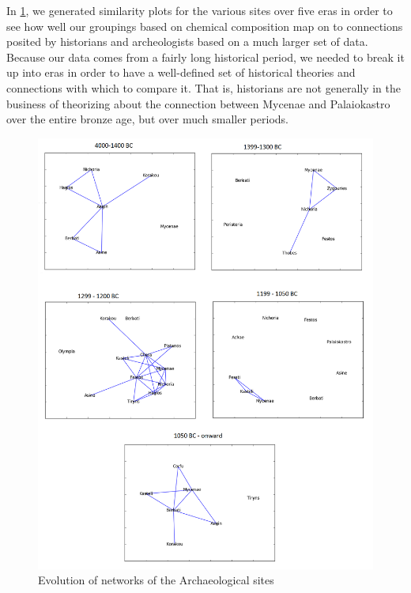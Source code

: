 



In \cref{fig:evolution}, we generated similarity plots for the various sites over five eras in order to see how well our groupings based on chemical composition map on to connections posited by historians and archeologists based on a much larger set of data. Because our data comes from a fairly long historical period, we needed to break it up into eras in order to have a well-defined set of historical theories and connections with which to compare it. That is, historians are not generally in the business of theorizing about the connection between Mycenae and Palaiokastro over the entire bronze age, but over much smaller periods. 



\begin{figure}
\includegraphics[width=\textwidth]{Network_evolution.png}
\caption{Evolution of networks of the Archaeological sites}
\label{fig:evolution}
\end{figure}


